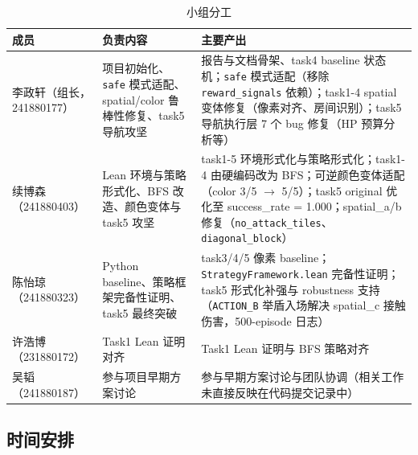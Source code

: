 \documentclass[12pt,a4paper]{ctexart}
\begin{document}
\begin{table}[H]
\centering
\begin{tabular}{p{}p{}p{}}
\toprule
成员 & 负责内容 & 主要产出 \\
\midrule
李政轩（组长，241880177） & 项目初始化、\texttt{safe} 模式适配、spatial/color 鲁棒性修复、task5 导航攻坚 & 报告与文档骨架、task4 baseline 状态机；\texttt{safe} 模式适配（移除 \texttt{reward\_signals} 依赖）；task1-4 spatial 变体修复（像素对齐、房间识别）；task5 导航执行层 7 个 bug 修复（HP 预算分析等） \\
续博森（241880403） & Lean 环境与策略形式化、BFS 改造、颜色变体与 task5 攻坚 & task1-5 环境形式化与策略形式化；task1-4 由硬编码改为 BFS；可逆颜色变体适配（color 3/5 $\to$ 5/5）；task5 original 优化至 success\_rate = 1.000；spatial\_a/b 修复（\texttt{no\_attack\_tiles}、\texttt{diagonal\_block}） \\
陈怡琼（241880323） & Python baseline、策略框架完备性证明、task5 最终突破 & task3/4/5 像素 baseline；\texttt{StrategyFramework.lean} 完备性证明；task5 形式化补强与 robustness 支持（\texttt{ACTION\_B} 举盾入场解决 spatial\_c 接触伤害，500-episode 日志） \\
许浩博（231880172） & Task1 Lean 证明对齐 & Task1 Lean 证明与 BFS 策略对齐 \\
吴韬（241880187） & 参与项目早期方案讨论 & 参与早期方案讨论与团队协调（相关工作未直接反映在代码提交记录中） \\
\bottomrule
\end{tabular}
\caption{小组分工}
\end{table}

\subsection{时间安排}
\end{document}
